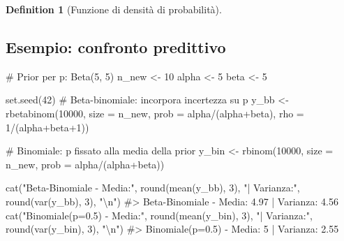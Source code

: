 \documentclass[
  letterpaper,
  DIV=11,
  numbers=noendperiod,
  oneside]{scrreprt}
\newenvironment{Shaded}{\begin{snugshade}}{\end{snugshade}}
\newcommand{\AttributeTok}[1]{\textcolor[rgb]{0.40,0.45,0.13}{#1}}
\newcommand{\CommentTok}[1]{\textcolor[rgb]{0.37,0.37,0.37}{#1}}
\newcommand{\DecValTok}[1]{\textcolor[rgb]{0.68,0.00,0.00}{#1}}
\newcommand{\FunctionTok}[1]{\textcolor[rgb]{0.28,0.35,0.67}{#1}}
\newcommand{\NormalTok}[1]{\textcolor[rgb]{0.00,0.23,0.31}{#1}}
\newcommand{\OtherTok}[1]{\textcolor[rgb]{0.00,0.23,0.31}{#1}}
\newcommand{\SpecialCharTok}[1]{\textcolor[rgb]{0.37,0.37,0.37}{#1}}
\newcommand{\StringTok}[1]{\textcolor[rgb]{0.13,0.47,0.30}{#1}}
\theoremstyle{definition}
\theoremstyle{plain}
\theoremstyle{definition}
\newtheorem{definition}{Definition}[chapter]
\theoremstyle{remark}
\begin{document}
\begin{definition}[Funzione di densità di
probabilità]
\subsection{Esempio: confronto
predittivo}\label{esempio-confronto-predittivo}

\begin{Shaded}
\begin{Highlighting}[]
\CommentTok{\# Prior per p: Beta(5, 5)}
\NormalTok{n\_new }\OtherTok{\textless{}{-}} \DecValTok{10}
\NormalTok{alpha }\OtherTok{\textless{}{-}} \DecValTok{5}
\NormalTok{beta }\OtherTok{\textless{}{-}} \DecValTok{5}

\FunctionTok{set.seed}\NormalTok{(}\DecValTok{42}\NormalTok{)}
\CommentTok{\# Beta{-}binomiale: incorpora incertezza su p}
\NormalTok{y\_bb }\OtherTok{\textless{}{-}} \FunctionTok{rbetabinom}\NormalTok{(}\DecValTok{10000}\NormalTok{, }\AttributeTok{size =}\NormalTok{ n\_new, }\AttributeTok{prob =}\NormalTok{ alpha}\SpecialCharTok{/}\NormalTok{(alpha}\SpecialCharTok{+}\NormalTok{beta), }\AttributeTok{rho =} \DecValTok{1}\SpecialCharTok{/}\NormalTok{(alpha}\SpecialCharTok{+}\NormalTok{beta}\SpecialCharTok{+}\DecValTok{1}\NormalTok{))}

\CommentTok{\# Binomiale: p fissato alla media della prior}
\NormalTok{y\_bin }\OtherTok{\textless{}{-}} \FunctionTok{rbinom}\NormalTok{(}\DecValTok{10000}\NormalTok{, }\AttributeTok{size =}\NormalTok{ n\_new, }\AttributeTok{prob =}\NormalTok{ alpha}\SpecialCharTok{/}\NormalTok{(alpha}\SpecialCharTok{+}\NormalTok{beta))}

\FunctionTok{cat}\NormalTok{(}\StringTok{"Beta{-}Binomiale {-} Media:"}\NormalTok{, }\FunctionTok{round}\NormalTok{(}\FunctionTok{mean}\NormalTok{(y\_bb), }\DecValTok{3}\NormalTok{), }
    \StringTok{"| Varianza:"}\NormalTok{, }\FunctionTok{round}\NormalTok{(}\FunctionTok{var}\NormalTok{(y\_bb), }\DecValTok{3}\NormalTok{), }\StringTok{"}\SpecialCharTok{\textbackslash{}n}\StringTok{"}\NormalTok{)}
\CommentTok{\#\textgreater{} Beta{-}Binomiale {-} Media: 4.97 | Varianza: 4.56}
\FunctionTok{cat}\NormalTok{(}\StringTok{"Binomiale(p=0.5) {-} Media:"}\NormalTok{, }\FunctionTok{round}\NormalTok{(}\FunctionTok{mean}\NormalTok{(y\_bin), }\DecValTok{3}\NormalTok{), }
    \StringTok{"| Varianza:"}\NormalTok{, }\FunctionTok{round}\NormalTok{(}\FunctionTok{var}\NormalTok{(y\_bin), }\DecValTok{3}\NormalTok{), }\StringTok{"}\SpecialCharTok{\textbackslash{}n}\StringTok{"}\NormalTok{)}
\CommentTok{\#\textgreater{} Binomiale(p=0.5) {-} Media: 5 | Varianza: 2.55}
\end{Highlighting}
\end{Shaded}


\end{definition}
\end{document}
